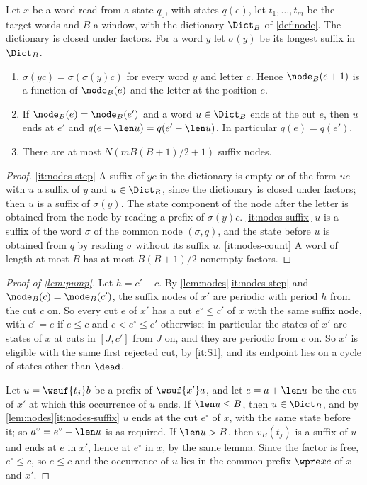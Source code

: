Let $x$ be a word read from a state $q_0$, with states $q(e)$, let
$t_1,\dots,t_m$ be the target words and $B$ a window, with the dictionary $\Dict_B$
of \cref{def:node}. The dictionary is closed under factors. For a word $y$
let $\sigma(y)$ be its longest suffix in $\Dict_B$.

\begin{lemma}\label{lem:nodes}
\begin{enumerate}
\item\label{it:nodes-step} $\sigma(yc)=\sigma(\sigma(y)c)$ for every word
  $y$ and letter $c$. Hence $\node_B(e+1)$ is a function of $\node_B(e)$ and
  the letter at the position $e$.
\item\label{it:nodes-suffix} If $\node_B(e)=\node_B(e')$ and a word
  $u\in\Dict_B$ ends at the cut $e$, then $u$ ends at $e'$ and
  $q(e-\len u)=q(e'-\len u)$. In particular $q(e)=q(e')$.
\item\label{it:nodes-count} There are at most $N(mB(B+1)/2+1)$ suffix nodes.
\end{enumerate}
\end{lemma}

\begin{proof}
\eqref{it:nodes-step} A suffix of $yc$ in the dictionary is empty or of the
form $uc$ with $u$ a suffix of $y$ and $u\in\Dict_B$, since the dictionary
is closed under factors; then $u$ is a suffix of $\sigma(y)$. The state
component of the node after the letter is obtained from the node by reading
a prefix of $\sigma(y)c$. \eqref{it:nodes-suffix} $u$ is a suffix of the
word $\sigma$ of the common node $(\sigma,q)$, and the state before $u$ is
obtained from $q$ by reading $\sigma$ without its suffix $u$.
\eqref{it:nodes-count} A word of length at most $B$ has at most $B(B+1)/2$
nonempty factors.
\end{proof}

\begin{proof}[Proof of \cref{lem:pump}]
Let $h=c'-c$. By \cref{lem:nodes}\eqref{it:nodes-step} and
$\node_B(c)=\node_B(c')$, the suffix nodes of $x'$ are periodic with period
$h$ from the cut $c$ on. So every cut $e$ of $x'$ has a cut $e^\circ\le c'$
of $x$ with the same suffix node, with $e^\circ=e$ if $e\le c$ and
$c<e^\circ\le c'$ otherwise; in particular the states of $x'$ are states of
$x$ at cuts in $[J,c']$ from $J$ on, and they are periodic from $c$ on. So
$x'$ is eligible with the same first rejected cut, by \ref{it:S1}, and its
endpoint lies on a cycle of states other than $\dead$.

Let $u=\wsuf{t_j}b$ be a prefix of $\wsuf{x'}a$, and let $e=a+\len u$ be
the cut of $x'$ at which this occurrence of $u$ ends. If $\len u\le B$,
then $u\in\Dict_B$, and by \cref{lem:nodes}\eqref{it:nodes-suffix} $u$ ends
at the cut $e^\circ$ of $x$, with the same state before it; so
$a^\circ=e^\circ-\len u$ is as required. If $\len u>B$, then $v_B(t_j)$ is a
suffix of $u$ and ends at $e$ in $x'$, hence at $e^\circ$ in $x$, by the
same lemma. Since the factor is free, $e^\circ\le c$, so $e\le c$ and the
occurrence of $u$ lies in the common prefix $\wpre xc$ of $x$ and $x'$.
\end{proof}

